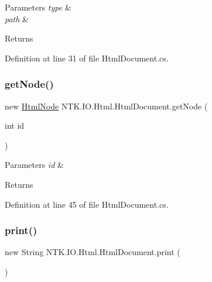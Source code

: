 \begin{DoxyParams}{Parameters}
{\em type} & \\
\hline
{\em path} & \\
\hline
\end{DoxyParams}
\begin{DoxyReturn}{Returns}

\end{DoxyReturn}


Definition at line 31 of file Html\+Document.\+cs.

\mbox{\label{class_n_t_k_1_1_i_o_1_1_html_1_1_html_document_a6e6151b2f9d9a21026411ecadb10b1a0}} 
\subsubsection{\texorpdfstring{getNode()}{getNode()}}
{\footnotesize\ttfamily new \mbox{\hyperlink{class_n_t_k_1_1_i_o_1_1_html_1_1_html_node}{Html\+Node}} N\+T\+K.\+I\+O.\+Html.\+Html\+Document.\+get\+Node (\begin{DoxyParamCaption}\item[{int}]{id }\end{DoxyParamCaption})}






\begin{DoxyParams}{Parameters}
{\em id} & \\
\hline
\end{DoxyParams}
\begin{DoxyReturn}{Returns}

\end{DoxyReturn}


Definition at line 45 of file Html\+Document.\+cs.

\mbox{\label{class_n_t_k_1_1_i_o_1_1_html_1_1_html_document_abe7771bf8a4159856c03e46b06a0e42a}} 
\subsubsection{\texorpdfstring{print()}{print()}}
{\footnotesize\ttfamily new String N\+T\+K.\+I\+O.\+Html.\+Html\+Document.\+print (\begin{DoxyParamCaption}{ }\end{DoxyParamCaption})}





